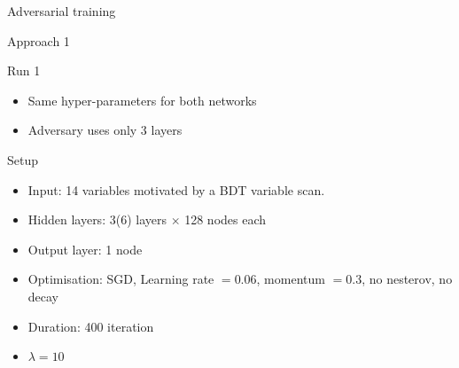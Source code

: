 \begin{frame}[c]
\begin{center}
\Huge Adversarial training
\end{center}
\end{frame}

\begin{frame}{Approach 1}
    \begin{block}{Run 1}
\begin{itemize}
    \item Same hyper-parameters for both networks
    \item Adversary uses only 3 layers
\end{itemize}
    \end{block}
    \begin{block}{Setup}
    \begin{itemize}
    \item Input: \num{14} variables motivated by a BDT variable scan.
    \item Hidden layers: \num{3}(\num{6}) \ELU layers $\times$ \num{128} nodes each
    \item Output layer: \num{1} \SIGMOID node
    \item Optimisation: SGD, Learning rate $=0.06$, momentum $=0.3$, no nesterov, no decay
    \item Duration: 400 iteration
    \item $\lambda = 10$
    \end{itemize}
    \end{block}
\end{frame}

